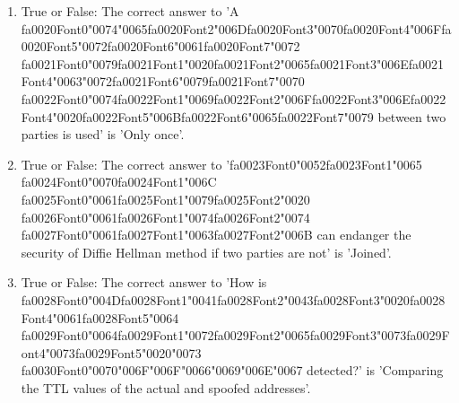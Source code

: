 \documentclass[12pt]{article}
\begin{document}
\begin{enumerate}[label=\arabic*.]
\item True or False: The correct answer to 'A {\csname fa0020Font0\endcsname\char"0074}{\char"0065}{\csname fa0020Font2\endcsname\char"006D}{\csname fa0020Font3\endcsname\char"0070}{\csname fa0020Font4\endcsname\char"006F}{\csname fa0020Font5\endcsname\char"0072}{\csname fa0020Font6\endcsname\char"0061}{\csname fa0020Font7\endcsname\char"0072} {\csname fa0021Font0\endcsname\char"0079}{\csname fa0021Font1\endcsname\char"0020}{\csname fa0021Font2\endcsname\char"0065}{\csname fa0021Font3\endcsname\char"006E}{\csname fa0021Font4\endcsname\char"0063}{\char"0072}{\csname fa0021Font6\endcsname\char"0079}{\csname fa0021Font7\endcsname\char"0070} {\csname fa0022Font0\endcsname\char"0074}{\csname fa0022Font1\endcsname\char"0069}{\csname fa0022Font2\endcsname\char"006F}{\csname fa0022Font3\endcsname\char"006E}{\csname fa0022Font4\endcsname\char"0020}{\csname fa0022Font5\endcsname\char"006B}{\csname fa0022Font6\endcsname\char"0065}{\csname fa0022Font7\endcsname\char"0079} between two parties is used' is 'Only once'.
\item True or False: The correct answer to '{\csname fa0023Font0\endcsname\char"0052}{\csname fa0023Font1\endcsname\char"0065} {\csname fa0024Font0\endcsname\char"0070}{\csname fa0024Font1\endcsname\char"006C} {\csname fa0025Font0\endcsname\char"0061}{\csname fa0025Font1\endcsname\char"0079}{\csname fa0025Font2\endcsname\char"0020} {\csname fa0026Font0\endcsname\char"0061}{\csname fa0026Font1\endcsname\char"0074}{\csname fa0026Font2\endcsname\char"0074} {\csname fa0027Font0\endcsname\char"0061}{\csname fa0027Font1\endcsname\char"0063}{\csname fa0027Font2\endcsname\char"006B} can endanger the security of Diffie Hellman method if two parties are not' is 'Joined'.
\item True or False: The correct answer to 'How is {\csname fa0028Font0\endcsname\char"004D}{\csname fa0028Font1\endcsname\char"0041}{\csname fa0028Font2\endcsname\char"0043}{\csname fa0028Font3\endcsname\char"0020}{\csname fa0028Font4\endcsname\char"0061}{\csname fa0028Font5\endcsname\char"0064} {\csname fa0029Font0\endcsname\char"0064}{\csname fa0029Font1\endcsname\char"0072}{\csname fa0029Font2\endcsname\char"0065}{\csname fa0029Font3\endcsname\char"0073}{\csname fa0029Font4\endcsname\char"0073}{\csname fa0029Font5\endcsname\char"0020}{\char"0073} {\csname fa0030Font0\endcsname\char"0070}{\char"006F}{\char"006F}{\char"0066}{\char"0069}{\char"006E}{\char"0067} detected?' is 'Comparing the TTL values of the actual and spoofed addresses'.

\end{enumerate}
\end{document}
